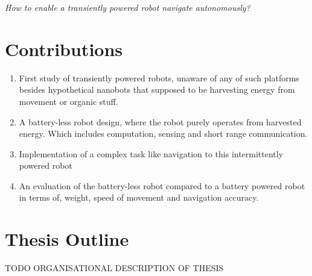 \begin{center}
	\textit{How to enable a transiently powered robot navigate autonomously?}
\end{center}

\section{Contributions}

\begin{enumerate}

\item First study of transiently powered robots, unaware of any of such platforms besides hypothetical nanobots that supposed to be harvesting energy from movement or organic stuff.

\item A battery-less robot design, where the robot purely operates from harvested energy. Which includes computation, sensing and short range communication.

\item Implementation of a complex task like navigation to this intermittently powered robot

\item An evaluation of the battery-less robot compared to a battery powered robot in terms of, weight, speed of movement and navigation accuracy.

% 

\end{enumerate}


\section{Thesis Outline}


\vspace{1\baselineskip}

\noindent
TODO ORGANISATIONAL DESCRIPTION OF THESIS

